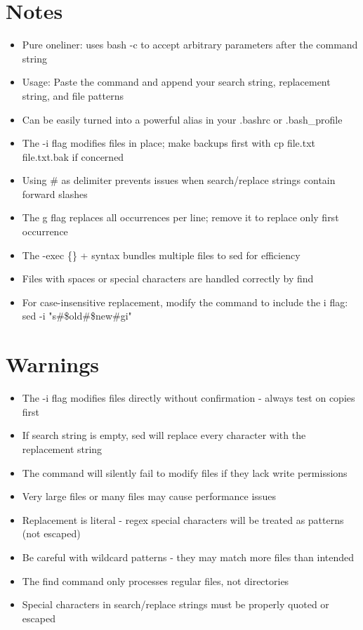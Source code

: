\documentclass[openany]{book}
\begin{document}
\section*{Notes}
\begin{itemize}
  \item Pure oneliner: uses bash -c to accept arbitrary parameters after the command string
  \item Usage: Paste the command and append your search string, replacement string, and file patterns
  \item Can be easily turned into a powerful alias in your .bashrc or .bash\_profile
  \item The -i flag modifies files in place; make backups first with cp file.txt file.txt.bak if concerned
  \item Using \# as delimiter prevents issues when search/replace strings contain forward slashes
  \item The g flag replaces all occurrences per line; remove it to replace only first occurrence
  \item The -exec \{\} + syntax bundles multiple files to sed for efficiency
  \item Files with spaces or special characters are handled correctly by find
  \item For case-insensitive replacement, modify the command to include the i flag: sed -i "s\#\$old\#\$new\#gi"
\end{itemize}

\section*{Warnings}
\begin{itemize}
  \item The -i flag modifies files directly without confirmation - always test on copies first
  \item If search string is empty, sed will replace every character with the replacement string
  \item The command will silently fail to modify files if they lack write permissions
  \item Very large files or many files may cause performance issues
  \item Replacement is literal - regex special characters will be treated as patterns (not escaped)
  \item Be careful with wildcard patterns - they may match more files than intended
  \item The find command only processes regular files, not directories
  \item Special characters in search/replace strings must be properly quoted or escaped
\end{itemize}
\end{document}
